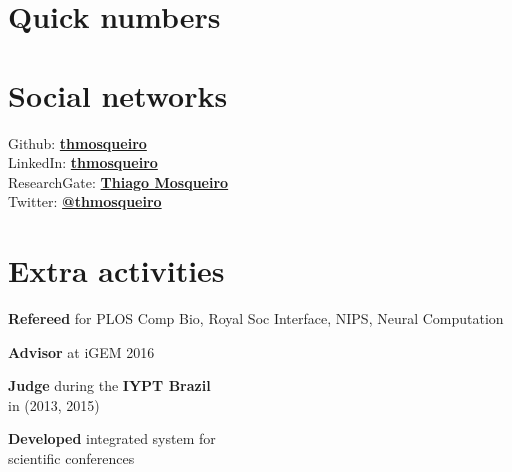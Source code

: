 \documentclass[letterpaper]{resume} %
\begin{document}
\begin{minipage}[t]{0.35\textwidth}
\sectionspace %


\sectionspace %


\section{Quick numbers}


\sectionspace %


\section{Social networks}

Github: \href{https://github.com/thmosqueiro}{\bf thmosqueiro} \\
LinkedIn: \href{https://www.linkedin.com/in/thmosqueiro}{\bf thmosqueiro} \\
ResearchGate: \href{https://www.researchgate.net/profile/Thiago_Mosqueiro}{\bf Thiago Mosqueiro} \\
Twitter: \href{https://twitter.com/thmosqueiro}{\bf @thmosqueiro} \\

\sectionspace %


\section{Extra activities}

{\bf Refereed} for PLOS Comp Bio, Royal Soc Interface, NIPS, Neural Computation

\vspace{0.2cm}
{\bf Advisor} at iGEM 2016

\vspace{0.2cm}
{\bf Judge} during the {\bf IYPT Brazil} \\ in (2013, 2015)

\vspace{0.2cm}
{\bf Developed} integrated system for \\scientific conferences




\end{minipage}
\end{document}
